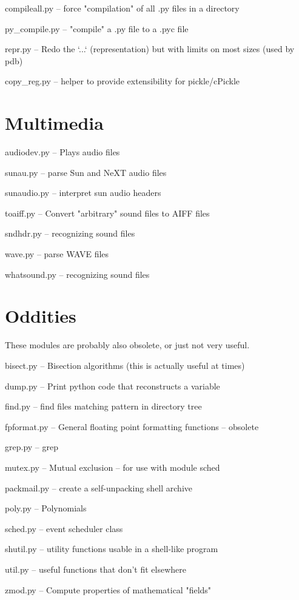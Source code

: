 compileall.py -- force "compilation" of all .py files in a directory

py_compile.py -- "compile" a .py file to a .pyc file

repr.py -- Redo the `...` (representation) but with limits on most
sizes (used by pdb)

copy_reg.py -- helper to provide extensibility for pickle/cPickle


\section{Multimedia}

audiodev.py -- Plays audio files

sunau.py -- parse Sun and NeXT audio files

sunaudio.py -- interpret sun audio headers

toaiff.py -- Convert "arbitrary" sound files to AIFF files

sndhdr.py -- recognizing sound files

wave.py -- parse WAVE files

whatsound.py -- recognizing sound files


\section{Oddities}

These modules are probably also obsolete, or just not very useful.

bisect.py -- Bisection algorithms (this is actually useful at times)

dump.py -- Print python code that reconstructs a variable

find.py -- find files matching pattern in directory tree

fpformat.py -- General floating point formatting functions -- obsolete

grep.py -- grep

mutex.py -- Mutual exclusion -- for use with module sched

packmail.py -- create a self-unpacking \UNIX{} shell archive

poly.py -- Polynomials

sched.py -- event scheduler class

shutil.py -- utility functions usable in a shell-like program

util.py -- useful functions that don't fit elsewhere

zmod.py -- Compute properties of mathematical "fields"

